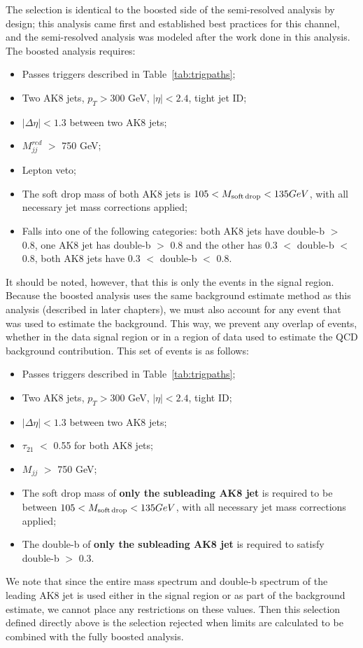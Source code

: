 The selection is identical to the boosted side of the semi-resolved analysis by design; this analysis came first and established best practices for this channel, and the semi-resolved analysis was modeled after the work done in this analysis. The boosted analysis requires:
\begin{itemize}
\item Passes triggers described in Table~\ref{tab:trigpaths};
\item Two AK8 jets, $p_{T} > 300$ GeV, $|\eta| < 2.4$, tight jet ID;
\item $|\Delta\eta| < 1.3$ between two AK8 jets;
\item $M_{jj}^{red}$ $>$ 750 GeV;
\item Lepton veto;
\item The soft drop mass of both AK8 jets is $105 < M_{\rm soft\,drop} < 135GeV$, with all necessary jet mass corrections applied;
\item Falls into one of the following categories: both AK8 jets have double-b $>$ 0.8, one AK8 jet has double-b $>$ 0.8 and the other has 0.3 $<$ double-b $<$ 0.8, both AK8 jets have 0.3 $<$ double-b $<$ 0.8.
\end{itemize}

It should be noted, however, that this is only the events in the signal region. Because the boosted analysis uses the same background estimate method as this analysis (described in later chapters), we must also account for any event that was used to estimate the background. This way, we prevent any overlap of events, whether in the data signal region or in a region of data used to estimate the QCD background contribution. This set of events is as follows:
\begin{itemize}
\item Passes triggers described in Table~\ref{tab:trigpaths};
\item Two AK8 jets, $p_{T} > 300$ GeV, $|\eta| < 2.4$, tight ID;
\item $|\Delta\eta| < 1.3$ between two AK8 jets;
\item $\tau_{21}$ $<$ 0.55 for both AK8 jets;
\item $M_{jj}$ $>$ 750 GeV;
\item The soft drop mass of \textbf{only the subleading AK8 jet} is required to be between $105 < M_{\rm soft\,drop} < 135GeV$, with all necessary jet mass corrections applied;
\item The double-b of \textbf{only the subleading AK8 jet} is required to satisfy double-b $>$ 0.3.
\end{itemize}
We note that since the entire mass spectrum and double-b spectrum of the leading AK8 jet is used either in the signal region or as part of the background estimate, we cannot place any restrictions on these values. Then this selection defined directly above is the selection rejected when limits are calculated to be combined with the fully boosted 
analysis. 

